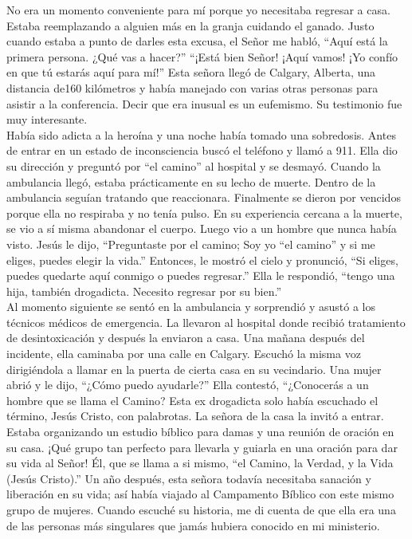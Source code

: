 \documentclass[twoside, 12pt]{book}
\begin{document}
No era un momento conveniente para mí porque yo necesitaba regresar a casa. Estaba reemplazando a alguien más en la granja cuidando el ganado. Justo cuando estaba a punto de darles esta excusa, el Señor me habló, “Aquí está la primera persona. ¿Qué vas a hacer?”
“¡Está bien Señor!  ¡Aquí vamos! ¡Yo confío en que tú estarás aquí para mí!” Esta señora llegó de Calgary, Alberta, una distancia de160 kilómetros y había manejado con varias otras personas para asistir a la conferencia.  Decir que era inusual es un eufemismo.  Su testimonio fue muy interesante. \\

Había sido adicta a la heroína y una noche había tomado una sobredosis.  Antes de entrar en un estado de inconsciencia buscó el teléfono y llamó a 911.  Ella dio su dirección y preguntó por “el camino” al hospital y se desmayó.  Cuando la ambulancia llegó, estaba prácticamente en su lecho de muerte.  Dentro de la ambulancia seguían tratando que reaccionara. Finalmente se dieron por vencidos porque ella no respiraba y no tenía pulso.  En su experiencia cercana a la muerte, se vio a sí misma abandonar el cuerpo.  Luego vio a un hombre que nunca había visto.
Jesús le dijo, “Preguntaste por el camino; Soy yo “el camino” y si me eliges, puedes elegir la vida.”  Entonces, le mostró el cielo y pronunció, “Si eliges, puedes quedarte aquí conmigo o puedes regresar.”  Ella le respondió, “tengo una hija, también drogadicta.  Necesito regresar por su bien.”\\

Al momento siguiente se sentó en la ambulancia y sorprendió y asustó a los técnicos médicos de emergencia.  La llevaron al hospital donde recibió tratamiento de desintoxicación y después la enviaron a casa.
Una mañana después del incidente, ella caminaba por una calle en Calgary. Escuchó la misma voz dirigiéndola a llamar en la puerta de cierta casa en su vecindario. Una mujer abrió y le dijo, “¿Cómo puedo ayudarle?”
Ella contestó, “¿Conocerás a un hombre que se llama el Camino?  Esta ex drogadicta solo había escuchado el término, Jesús Cristo, con palabrotas. La señora de la casa la invitó a entrar.  Estaba organizando un estudio bíblico para damas y una reunión de oración en su casa.  ¡Qué grupo tan perfecto para llevarla y guiarla en una oración para dar su vida al Señor!  Él, que se llama a si mismo, “el Camino, la Verdad, y la Vida (Jesús Cristo).”
Un año después, esta señora todavía necesitaba sanación y liberación en su vida; así había viajado al Campamento Bíblico con este mismo grupo de mujeres.  Cuando escuché su historia, me di cuenta de que ella era una de las personas más singulares que jamás hubiera conocido en mi ministerio.\\
\end{document}
